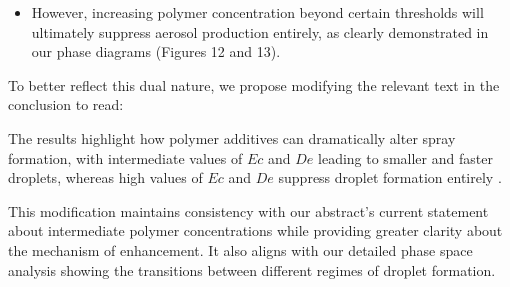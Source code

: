 \documentclass[]{article}
\newcommand{\oo}{\color{magenta} \normalfont}
\newcommand{\bb}{\color{black} \normalfont}
\begin{document}
\begin{enumerate}
\begin{itemize}
    	\item However, increasing polymer concentration beyond certain thresholds will ultimately suppress aerosol production entirely, as clearly demonstrated in our phase diagrams (Figures 12 and 13).
    \end{itemize}

    To better reflect this dual nature, we propose modifying the relevant text in the conclusion to read:

	\oo
	The results highlight how polymer additives can dramatically alter spray formation, with intermediate values of $Ec$ and $De$ leading to smaller and faster droplets, whereas high values of $Ec$ and $De$ suppress droplet formation entirely \citep{kant2023bag}.
	\bb

	This modification maintains consistency with our abstract's current statement about intermediate polymer concentrations while providing greater clarity about the mechanism of enhancement. It also aligns with our detailed phase space analysis showing the transitions between different regimes of droplet formation.


\end{enumerate}

\printbibliography
\end{document}
